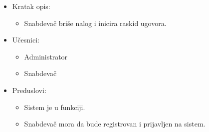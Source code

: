 
\begin{itemize}
    \item Kratak opis:
        \begin{itemize}
            \item Snabdevač briše nalog i inicira raskid ugovora.
        \end{itemize}
    \item Učesnici:
        \begin{itemize}
            \item Administrator
            \item Snabdevač
        \end{itemize}
    \item Preduslovi:
        \begin{itemize}
          \item Sistem je u funkciji.
            \item Snabdevač mora da bude registrovan i prijavljen na sistem.
            

\end{itemize}
\end{itemize}
